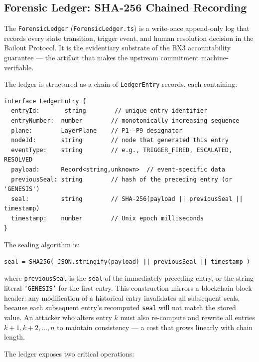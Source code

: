 \subsection{Forensic Ledger: SHA-256 Chained Recording}

The \texttt{ForensicLedger} (\texttt{ForensicLedger.ts}) is a write-once append-only
log that records every state transition, trigger event, and human resolution
decision in the Bailout Protocol.  It is the evidentiary substrate of the BX3
accountability guarantee — the artifact that makes the upstream commitment
machine-verifiable.

The ledger is structured as a chain of \texttt{LedgerEntry} records, each containing:

\begin{verbatim}
interface LedgerEntry {
  entryId:       string        // unique entry identifier
  entryNumber:  number        // monotonically increasing sequence
  plane:        LayerPlane    // P1--P9 designator
  nodeId:       string        // node that generated this entry
  eventType:    string        // e.g., TRIGGER_FIRED, ESCALATED, RESOLVED
  payload:      Record<string,unknown>  // event-specific data
  previousSeal: string        // hash of the preceding entry (or 'GENESIS')
  seal:         string        // SHA-256(payload || previousSeal || timestamp)
  timestamp:    number        // Unix epoch milliseconds
}
\end{verbatim}

The sealing algorithm is:

\begin{verbatim}
seal = SHA256( JSON.stringify(payload) || previousSeal || timestamp )
\end{verbatim}

where \texttt{previousSeal} is the \texttt{seal} of the immediately preceding entry,
or the string literal \texttt{'GENESIS'} for the first entry.  This construction
mirrors a blockchain block header: any modification of a historical entry invalidates
all subsequent seals, because each subsequent entry's recomputed \texttt{seal} will
not match the stored value.  An attacker who alters entry $k$ must also re-compute
and rewrite all entries $k+1, k+2, \ldots, n$ to maintain consistency — a cost that
grows linearly with chain length.

The ledger exposes two critical operations:

